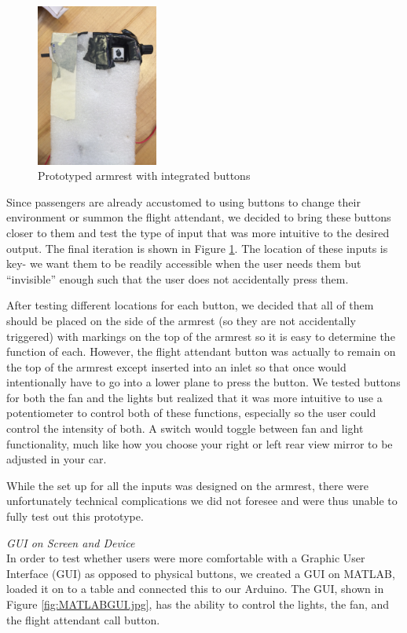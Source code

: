 \begin{figure}[h]
  \centering
     \includegraphics[width=4cm]{images/FoamArmrest.jpg}
   \caption{ Prototyped armrest with integrated buttons}
  \label{fig:FoamArmrest.jpg}
\end{figure}

Since passengers are already accustomed to using buttons to change their environment or summon the flight attendant, we decided to bring these buttons closer to them and test the type of input that was more intuitive to the desired output. The final iteration is shown in  Figure \ref{fig:FoamArmrest.jpg}. The location of these inputs is key- we want them to be readily accessible when the user needs them but “invisible” enough such that the user does not accidentally press them. 

After testing different locations for each button, we decided that all of them should be placed on the side of the armrest (so they are not accidentally triggered) with markings on the top of the armrest so it is easy to determine the function of each. However, the flight attendant button was actually to remain on the top of the armrest except inserted into an inlet so that once would intentionally have to go into a lower plane to press the button. We tested buttons for both the fan and the lights but realized that it was more intuitive to use a potentiometer to control both of these functions, especially so the user could control the intensity of both. A switch would toggle between fan and light functionality, much like how you choose your right or left rear view mirror to be adjusted in your car.  

While the set up for all the inputs was designed on the armrest, there were unfortunately technical complications we did not foresee and were thus unable to fully test out this prototype. 

\emph{GUI on Screen and Device}\\
In order to test whether users were more comfortable with a Graphic User Interface (GUI) as opposed to physical buttons, we created a GUI on MATLAB, loaded it on to a table and connected this to our Arduino. The GUI, shown in Figure \ref{fig:MATLABGUI.jpg}, has the ability to control the lights, the fan, and the flight attendant call button.

